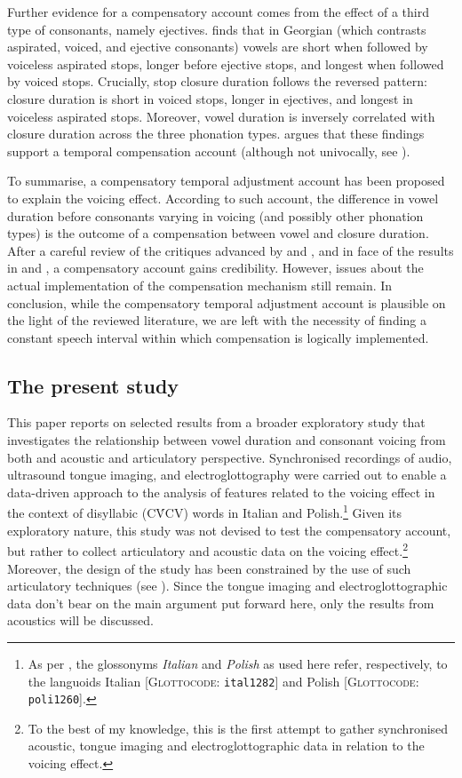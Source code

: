 \documentclass[preprint]{JASAnew}
\begin{document}
Further evidence for a compensatory account comes from the effect of a
third type of consonants, namely ejectives. \citet{begus2017} finds that
in Georgian (which contrasts aspirated, voiced, and ejective consonants)
vowels are short when followed by voiceless aspirated stops, longer
before ejective stops, and longest when followed by voiced stops.
Crucially, stop closure duration follows the reversed pattern: closure
duration is short in voiced stops, longer in ejectives, and longest in
voiceless aspirated stops. Moreover, vowel duration is inversely
correlated with closure duration across the three phonation types.
\citet{begus2017} argues that these findings support a temporal
compensation account (although not univocally, see
\citealt[Section V]{begus2017}).

To summarise, a compensatory temporal adjustment account has been
proposed to explain the voicing effect. According to such account, the
difference in vowel duration before consonants varying in voicing (and
possibly other phonation types) is the outcome of a compensation between
vowel and closure duration. After a careful review of the critiques
advanced by \citet{chen1970} and \citet{maddieson1976}, and in face of
the results in \citet{slis1969} and \citet{begus2017}, a compensatory
account gains credibility. However, issues about the actual
implementation of the compensation mechanism still remain. In
conclusion, while the compensatory temporal adjustment account is
plausible on the light of the reviewed literature, we are left with the
necessity of finding a constant speech interval within which
compensation is logically implemented.

\hypertarget{the-present-study}{%
\subsection{The present study}\label{the-present-study}}

This paper reports on selected results from a broader exploratory study
that investigates the relationship between vowel duration and consonant
voicing from both and acoustic and articulatory perspective.
Synchronised recordings of audio, ultrasound tongue imaging, and
electroglottography were carried out to enable a data-driven approach to
the analysis of features related to the voicing effect in the context of
disyllabic (CV́CV) words in Italian and
Polish.\footnote{As per \citet{cysouw2013}, the glossonyms \textit{Italian} and \textit{Polish} as used here refer, respectively, to the languoids Italian [\textsc{Glottocode}: \texttt{ital1282}] and Polish [\textsc{Glottocode}: \texttt{poli1260}].}
Given its exploratory nature, this study was not devised to test the
compensatory account, but rather to collect articulatory and acoustic
data on the voicing
effect.\footnote{To the best of my knowledge, this is the first attempt to gather synchronised acoustic, tongue imaging and electroglottographic data in relation to the voicing effect.}
Moreover, the design of the study has been constrained by the use of
such articulatory techniques (see ). Since the tongue
imaging and electroglottographic data don't bear on the main argument
put forward here, only the results from acoustics will be discussed.
\end{document}
